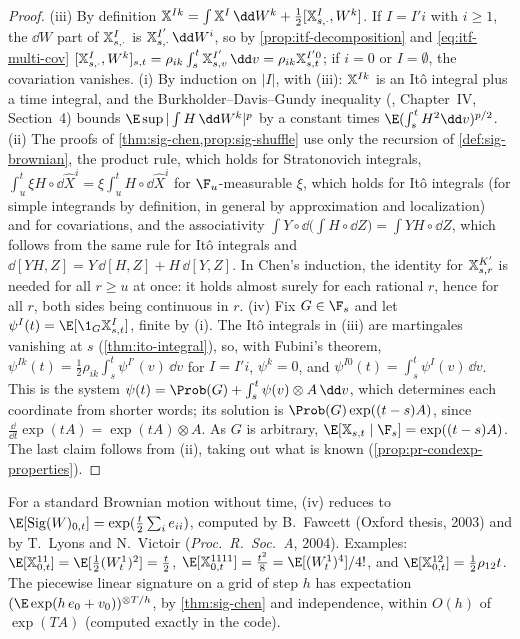 \begin{proof}
(iii) By definition $\sigX^{Ik}=\int\sigX^I\,\dd W^k+\frac12[\sigX^I_{s,\cdot},W^k]$. If $I=I'i$ with $i\ge1$, the
$\dd W$ part of $\mathbb X^I_{s,\cdot}$ is $\sigX^{I'}_{s,\cdot}\,\dd W^i$, so by
\cref{prop:itf-decomposition} and \eqref{eq:itf-multi-cov} $[\sigX^I_{s,\cdot},W^k]_{s,t}=\rho_{ik}\int_s^t\sigX^{I'}_{s,v}\,\dd v=\rho_{ik}\sigX^{I'0}_{s,t}$;
if $i=0$ or $I=\emptyset$, the covariation vanishes.
(i) By induction on $|I|$, with (iii): $\mathbb X^{Ik}$ is an It\^o integral plus a time integral, and the
Burkholder--Davis--Gundy inequality (\textcite{revuz-yor}, Chapter~IV, Section~4) bounds
$\E\sup|\int H\,\dd W^k|^p$ by a constant times $\E(\int_s^tH^2\dd v)^{p/2}$.
(ii) The proofs of \cref{thm:sig-chen,prop:sig-shuffle} use only the recursion of \cref{def:sig-brownian},
the product rule, which holds for Stratonovich integrals, $\int_u^t\xi H\circ\dd\widehat X^i=\xi\int_u^tH\circ\dd\widehat X^i$
for $\F_u$-measurable $\xi$, which holds for It\^o integrals (for simple integrands by definition, in general by
approximation and localization) and for covariations, and the associativity
$\int Y\circ\dd\big(\int H\circ\dd Z\big)=\int YH\circ\dd Z$, which follows from the same rule for It\^o integrals and
$\dd[YH,Z]=Y\,\dd[H,Z]+H\,\dd[Y,Z]$. In Chen's induction, the identity for $\mathbb X^{K'}_{s,r}$ is needed for all $r\ge u$
at once: it holds almost surely for each rational $r$, hence for all $r$, both sides being continuous in $r$.
(iv) Fix $G\in\F_s$ and let $\psi^I(t)=\E[\1_G\sigX^I_{s,t}]$, finite by (i). The It\^o integrals in (iii) are
martingales vanishing at $s$ (\cref{thm:ito-integral}), so, with Fubini's theorem,
$\psi^{Ik}(t)=\frac12\rho_{ik}\int_s^t\psi^{I'}(v)\,\dd v$ for $I=I'i$, $\psi^k=0$, and $\psi^{I0}(t)=\int_s^t\psi^I(v)\,\dd v$.
This is the system $\psi(t)=\Prob(G)+\int_s^t\psi(v)\otimes A\,\dd v$, which determines each coordinate from shorter
words; its solution is $\Prob(G)\exp((t-s)A)$, since $\frac{\dd}{\dd t}\exp(tA)=\exp(tA)\otimes A$. As $G$ is
arbitrary, $\E[\sigX_{s,t}\mid\F_s]=\exp((t-s)A)$. The last claim follows from (ii), taking out what is known
(\cref{prop:pr-condexp-properties}).
\end{proof}

For a standard Brownian motion without time, (iv) reduces to $\E[\sigSig(W)_{0,t}]=\exp(\frac t2\sum_ie_{ii})$,
computed by B.~Fawcett (Oxford thesis, 2003) and by T.~Lyons and N.~Victoir (\emph{Proc.\ R.\ Soc.\ A},
2004). Examples: $\E[\sigX^{11}_{0,t}]=\E[\frac12(W^1_t)^2]=\frac t2$, $\E[\sigX^{1111}_{0,t}]=\frac{t^2}8=\E[(W^1_t)^4]/4!$, and
$\E[\sigX^{12}_{0,t}]=\frac12\rho_{12}t$. The piecewise linear signature on a grid of step $h$ has expectation
$(\E\exp(h\,e_0+v_0))^{\otimes T/h}$, by \cref{thm:sig-chen} and independence, within $O(h)$ of $\exp(TA)$
(computed exactly in the code).


